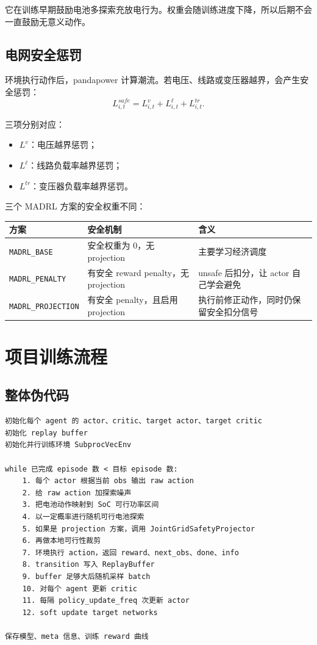 \documentclass[UTF8,zihao=-4]{ctexart}
\begin{document}
它在训练早期鼓励电池多探索充放电行为。权重会随训练进度下降，所以后期不会一直鼓励无意义动作。

\subsection{电网安全惩罚}

环境执行动作后，pandapower 计算潮流。若电压、线路或变压器越界，会产生安全惩罚：
\begin{equation}
L^{safe}_{i,t}
=
L^v_{i,t}
+
L^\ell_{i,t}
+
L^{tr}_{i,t}.
\end{equation}

三项分别对应：
\begin{itemize}
  \item $L^v$：电压越界惩罚；
  \item $L^\ell$：线路负载率越界惩罚；
  \item $L^{tr}$：变压器负载率越界惩罚。
\end{itemize}

三个 MADRL 方案的安全权重不同：
\begin{longtable}{p{3.7cm}p{3.4cm}p{6.5cm}}
\toprule
方案 & 安全机制 & 含义 \\
\midrule
\endhead
\texttt{MADRL\_BASE} & 安全权重为 0，无 projection & 主要学习经济调度 \\
\texttt{MADRL\_PENALTY} & 有安全 reward penalty，无 projection & unsafe 后扣分，让 actor 自己学会避免 \\
\texttt{MADRL\_PROJECTION} & 有安全 penalty，且启用 projection & 执行前修正动作，同时仍保留安全扣分信号 \\
\bottomrule
\end{longtable}

\section{项目训练流程}

\subsection{整体伪代码}

\begin{lstlisting}[language={},caption={项目 MADRL 训练流程}]
初始化每个 agent 的 actor、critic、target actor、target critic
初始化 replay buffer
初始化并行训练环境 SubprocVecEnv

while 已完成 episode 数 < 目标 episode 数:
    1. 每个 actor 根据当前 obs 输出 raw action
    2. 给 raw action 加探索噪声
    3. 把电池动作映射到 SoC 可行功率区间
    4. 以一定概率进行随机可行电池探索
    5. 如果是 projection 方案，调用 JointGridSafetyProjector
    6. 再做本地可行性裁剪
    7. 环境执行 action，返回 reward、next_obs、done、info
    8. transition 写入 ReplayBuffer
    9. buffer 足够大后随机采样 batch
    10. 对每个 agent 更新 critic
    11. 每隔 policy_update_freq 次更新 actor
    12. soft update target networks

保存模型、meta 信息、训练 reward 曲线
\end{lstlisting}
\end{document}
